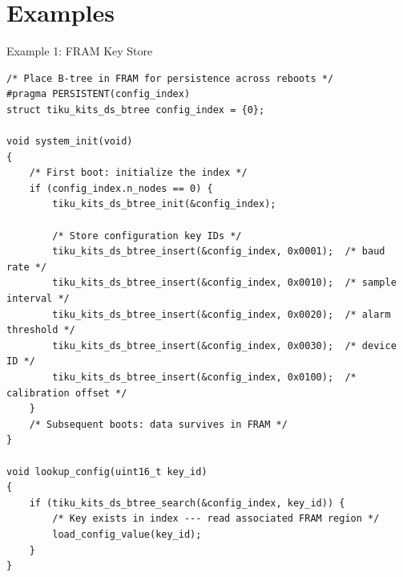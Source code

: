 \documentclass[aspectratio=169, 10pt]{beamer}
\begin{document}
\section{Examples}

\begin{frame}[fragile]{Example 1: FRAM Key Store}
\begin{lstlisting}[style=cstyle,
  title={examples/example\_ds\_btree.c --- persistent key store}]
/* Place B-tree in FRAM for persistence across reboots */
#pragma PERSISTENT(config_index)
struct tiku_kits_ds_btree config_index = {0};

void system_init(void)
{
    /* First boot: initialize the index */
    if (config_index.n_nodes == 0) {
        tiku_kits_ds_btree_init(&config_index);

        /* Store configuration key IDs */
        tiku_kits_ds_btree_insert(&config_index, 0x0001);  /* baud rate */
        tiku_kits_ds_btree_insert(&config_index, 0x0010);  /* sample interval */
        tiku_kits_ds_btree_insert(&config_index, 0x0020);  /* alarm threshold */
        tiku_kits_ds_btree_insert(&config_index, 0x0030);  /* device ID */
        tiku_kits_ds_btree_insert(&config_index, 0x0100);  /* calibration offset */
    }
    /* Subsequent boots: data survives in FRAM */
}

void lookup_config(uint16_t key_id)
{
    if (tiku_kits_ds_btree_search(&config_index, key_id)) {
        /* Key exists in index --- read associated FRAM region */
        load_config_value(key_id);
    }
}
\end{lstlisting}
\end{frame}
\end{document}
